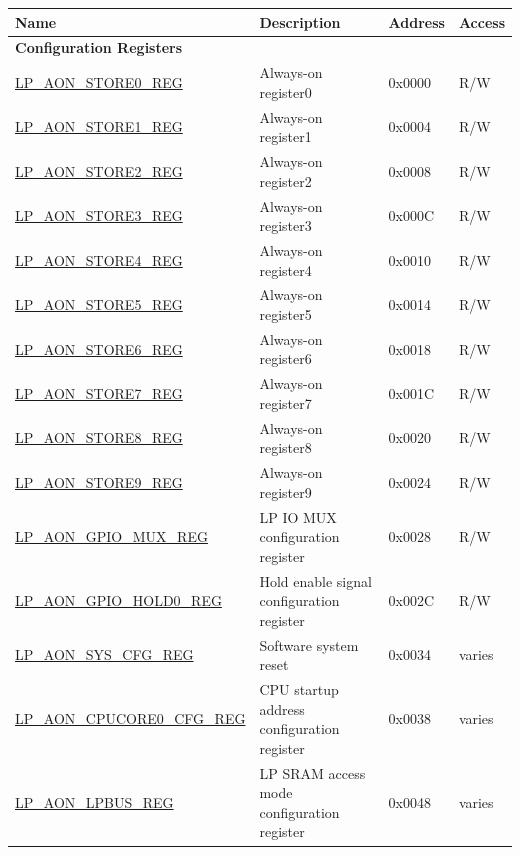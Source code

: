 \begin{longtable}{ | l | p{7cm} | p{1.2cm} | p{1.5cm} | }
\hline\rowcolor{lightgray}
\textbf{Name} & \textbf{Description} &  \textbf{Address} & \textbf{Access} \\ \hline
\endhead
\multicolumn{4}{|l|}{\textbf{Configuration Registers}} \\ \hline
\hyperref[regdesc:LPAONSTORENREG]{LP\_AON\_STORE0\_REG} & Always-on register0 & 0x0000 & R/W \\ \hline
\hyperref[regdesc:LPAONSTORENREG]{LP\_AON\_STORE1\_REG} & Always-on register1 & 0x0004 & R/W \\ \hline
\hyperref[regdesc:LPAONSTORENREG]{LP\_AON\_STORE2\_REG} & Always-on register2 & 0x0008 & R/W \\ \hline
\hyperref[regdesc:LPAONSTORENREG]{LP\_AON\_STORE3\_REG} & Always-on register3 & 0x000C & R/W \\ \hline
\hyperref[regdesc:LPAONSTORENREG]{LP\_AON\_STORE4\_REG} & Always-on register4 & 0x0010 & R/W \\ \hline
\hyperref[regdesc:LPAONSTORENREG]{LP\_AON\_STORE5\_REG} & Always-on register5 & 0x0014 & R/W \\ \hline
\hyperref[regdesc:LPAONSTORENREG]{LP\_AON\_STORE6\_REG} & Always-on register6 & 0x0018 & R/W \\ \hline
\hyperref[regdesc:LPAONSTORENREG]{LP\_AON\_STORE7\_REG} & Always-on register7 & 0x001C & R/W \\ \hline
\hyperref[regdesc:LPAONSTORENREG]{LP\_AON\_STORE8\_REG} & Always-on register8 & 0x0020 & R/W \\ \hline
\hyperref[regdesc:LPAONSTORENREG]{LP\_AON\_STORE9\_REG} & Always-on register9 & 0x0024 & R/W \\ \hline
\hyperref[regdesc:LPAONGPIOMUXREG]{LP\_AON\_GPIO\_MUX\_REG} & LP IO MUX configuration register & 0x0028 & R/W \\ \hline
\hyperref[regdesc:LPAONGPIOHOLD0REG]{LP\_AON\_GPIO\_HOLD0\_REG} & Hold enable signal configuration register & 0x002C & R/W \\ \hline
\hyperref[regdesc:LPAONSYSCFGREG]{LP\_AON\_SYS\_CFG\_REG} & Software system reset & 0x0034 & varies \\ \hline
\hyperref[regdesc:LPAONCPUCORE0CFGREG]{LP\_AON\_CPUCORE0\_CFG\_REG} & CPU startup address configuration register & 0x0038 & varies \\ \hline
\hyperref[regdesc:LPAONLPBUSREG]{LP\_AON\_LPBUS\_REG} & LP SRAM access mode configuration register & 0x0048 & varies \\ \hline
\end{longtable}
